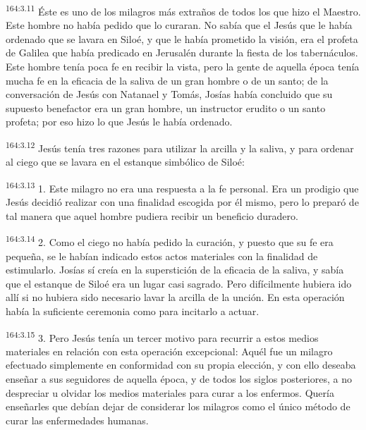 \par
\textsuperscript{164:3.11} Éste es uno de los milagros más extraños de todos los que hizo el Maestro. Este hombre no había pedido que lo curaran. No sabía que el Jesús que le había ordenado que se lavara en Siloé, y que le había prometido la visión, era el profeta de Galilea que había predicado en Jerusalén durante la fiesta de los tabernáculos. Este hombre tenía poca fe en recibir la vista, pero la gente de aquella época tenía mucha fe en la eficacia de la saliva de un gran hombre o de un santo; de la conversación de Jesús con Natanael y Tomás, Josías había concluido que su supuesto benefactor era un gran hombre, un instructor erudito o un santo profeta; por eso hizo lo que Jesús le había ordenado.

\par
\textsuperscript{164:3.12} Jesús tenía tres razones para utilizar la arcilla y la saliva, y para ordenar al ciego que se lavara en el estanque simbólico de Siloé:

\par
\textsuperscript{164:3.13} 1. Este milagro no era una respuesta a la fe personal. Era un prodigio que Jesús decidió realizar con una finalidad escogida por él mismo, pero lo preparó de tal manera que aquel hombre pudiera recibir un beneficio duradero.

\par
\textsuperscript{164:3.14} 2. Como el ciego no había pedido la curación, y puesto que su fe era pequeña, se le habían indicado estos actos materiales con la finalidad de estimularlo. Josías sí creía en la superstición de la eficacia de la saliva, y sabía que el estanque de Siloé era un lugar casi sagrado. Pero difícilmente hubiera ido allí si no hubiera sido necesario lavar la arcilla de la unción. En esta operación había la suficiente ceremonia como para incitarlo a actuar.

\par
\textsuperscript{164:3.15} 3. Pero Jesús tenía un tercer motivo para recurrir a estos medios materiales en relación con esta operación excepcional: Aquél fue un milagro efectuado simplemente en conformidad con su propia elección, y con ello deseaba enseñar a sus seguidores de aquella época, y de todos los siglos posteriores, a no despreciar u olvidar los medios materiales para curar a los enfermos. Quería enseñarles que debían dejar de considerar los milagros como el único método de curar las enfermedades humanas.

